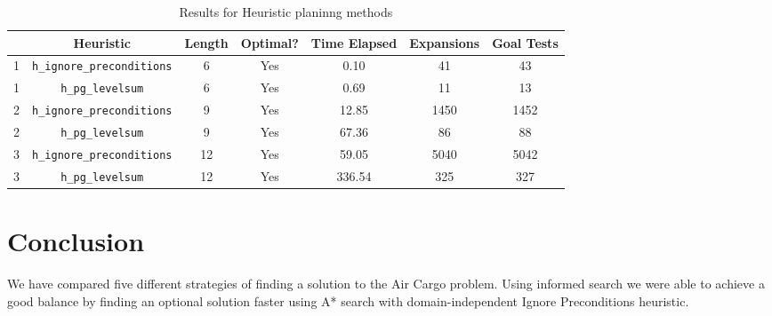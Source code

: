 \documentclass[oneside]{article}   	%
\newcommand{\hip}{\texttt{h\_ignore\_preconditions}}
\newcommand{\hpg}{\texttt{h\_pg\_levelsum}}
\begin{document}
\begin{table}[ht]
\caption{Results for Heuristic planinng methods}
\begin{center}
\begin{tabular}{c|c|ccccc}
   & Heuristic & Length & Optimal? & Time Elapsed & Expansions & Goal Tests\\
   \hline
1 & \hip & 6 & Yes & 0.10 & 41 & 43 \\
1 & \hpg & 6 & Yes & 0.69 & 11 & 13 \\
   \hline
2 & \hip & 9 & Yes & 12.85 & 1450 & 1452 \\
2 & \hpg & 9 & Yes & 67.36 &  86 & 88  \\
   \hline
3 & \hip & 12 & Yes & 59.05 & 5040 & 5042 \\
3 & \hpg & 12 & Yes & 336.54 & 325 & 327 
\end{tabular}
\end{center}
\label{Heuristic}
\end{table}%

\section{Conclusion}

We have compared five different strategies of finding a solution to the Air Cargo problem. Using informed search we were able to achieve a good balance by finding an optional solution faster using A* search with domain-independent Ignore Preconditions heuristic. 
\end{document}

